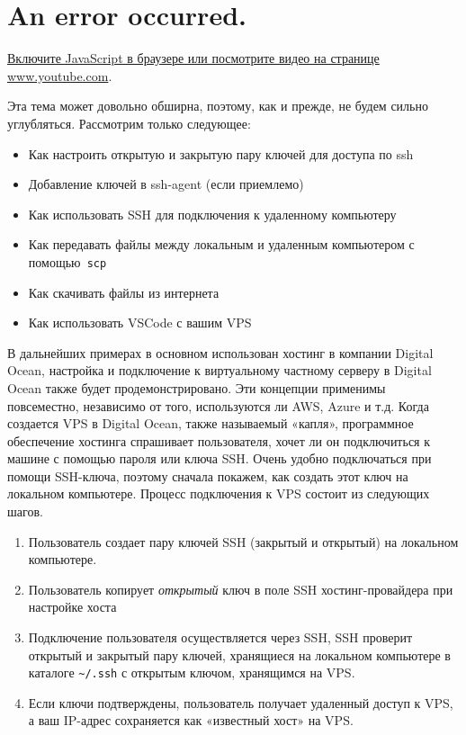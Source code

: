 \documentclass{report}
\begin{document}
\hypertarget{player}{}

\hypertarget{an-error-occurred.}{%
\section{An error occurred.}\label{an-error-occurred.}}

\href{https://www.youtube.com/watch?v=wWrQdkoBZEI}{Включите JavaScript в
браузере или посмотрите видео на странице www.youtube.com}.

Эта тема может довольно обширна, поэтому, как и прежде, не будем сильно
углубляться. Рассмотрим только следующее:

\begin{itemize}
\tightlist
\item
  Как настроить открытую и закрытую пару ключей для доступа по ssh
\item
  Добавление ключей в ssh-agent (если приемлемо)
\item
  Как использовать SSH для подключения к удаленному компьютеру
\item
  Как передавать файлы между локальным и удаленным компьютером с
  помощью\texttt{\ scp}
\item
  Как скачивать файлы из интернета
\item
  Как использовать VSCode с вашим VPS
\end{itemize}

В дальнейших примерах в основном использован хостинг в компании Digital
Ocean, настройка и подключение к виртуальному частному серверу в Digital
Ocean также будет продемонстрировано. Эти концепции применимы
повсеместно, независимо от того, используются ли AWS, Azure и т.д. Когда
создается VPS в Digital Ocean, также называемый «капля», программное
обеспечение хостинга спрашивает пользователя, хочет ли он подключиться к
машине с помощью пароля или ключа SSH. Очень удобно подключаться при
помощи SSH-ключа, поэтому сначала покажем, как создать этот ключ на
локальном компьютере. Процесс подключения к VPS состоит из следующих
шагов.

\begin{enumerate}
\tightlist
\item
  Пользователь создает пару ключей SSH (закрытый и открытый) на
  локальном компьютере.
\item
  Пользователь копирует \emph{открытый} ключ в поле SSH
  хостинг-провайдера при настройке хоста
\item
  Подключение пользователя осуществляется через SSH, SSH проверит
  открытый и закрытый пару ключей, хранящиеся на локальном компьютере в
  каталоге \texttt{\textasciitilde{}/.ssh} с открытым ключом, хранящимся
  на VPS.
\item
  Если ключи подтверждены, пользователь получает удаленный доступ к VPS,
  а ваш IP-адрес сохраняется как «известный хост» на VPS.
\end{enumerate}
\end{document}
